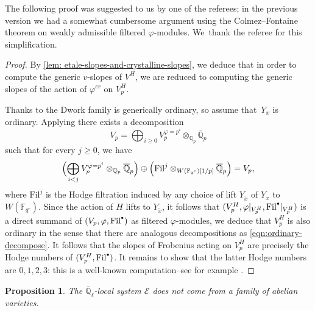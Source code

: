 \documentclass[11pt]{article}
\newcommand{\csbullet}{{\raisebox{1pt}{$\scriptscriptstyle\bullet$}}}
\numberwithin{equation}{subsection}
\newtheorem{prop}[thm]{Proposition}
\theoremstyle{definition}
\newcommand\Fil{\mathrm{Fil}}
\newcommand{\Qp}{\mathbb{Q}_p}
\newcommand{\Qpbar}{\overline{\mathbb Q}_p}
\newcommand{\Qlbar}{\overline{\mathbb{Q}}_{\ell}}
\begin{document}
The following proof was suggested to us by one of the referees; in the previous version we had a somewhat cumbersome argument using the Colmez--Fontaine theorem on weakly admissible filtered $\varphi$-modules. We~thank the referee for this simplification.

\begin{proof}
By \cref{lem: etale-slopes-and-crystalline-slopes}, we deduce that in order to compute the generic $v$-slopes of $V^H$, we are reduced to computing the generic slopes of the action of $\varphi^{er}$ on $V_p^H$.

Thanks to \cite[Th.\,2.2]{Yu-Variation-of-the-Unit-Root-Along-the-Dwork-Family-of-Calabi-Yau-Varieties} the Dwork family is generically ordinary, so assume that~$Y_x$ is ordinary. Applying \cite[Prop.\,1.3.2]{Deligne-Cristaux-ordinaires-et-coordonnees-canoniques} there exists a decomposition
\[
V_p=\bigoplus_{i\geq 0}V_p^{\varphi=p^i}\otimes_{\Qp}\Qpbar
\]
such that for every $j\geq 0$, we have
\begin{equation}\label{eqn:ordinary-decompose} \Bigl(\bigoplus_{i<j}V_p^{\varphi=p^i}\otimes_{\Qp}\Qpbar\Bigr)\oplus\Bigl(\mathrm{Fil}^j\otimes_{W(\mathbb{F}_{q^r})[1/p]}\Qpbar\Bigr)=V_p,
\end{equation}
where $\mathrm{Fil}^j$ is the Hodge filtration induced by any choice of lift $Y_{\tilde{x}}$ of $Y_x$ to $W(\mathbb{F}_{q^r})$. Since the action of $H$ lifts to $Y_{\tilde{x}}$, it follows that $(V_p^H, \varphi|_{V_{p}^H}, \Fil^{\csbullet}|_{V_{p}^H})$ is a direct summand of $(V_p, \varphi, \Fil^{\csbullet})$ as filtered $\varphi$-modules, we deduce that $V_p^H$ is also ordinary in the sense that there are analogous decompositions as \eqref{eqn:ordinary-decompose}. It follows that the slopes of Frobenius acting on $V_p^H$ are precisely the Hodge numbers of $(V_p^H, \Fil^{\csbullet})$. It remains to show that the latter Hodge numbers are $0,1,2,3$: this is a well-known computation--see for example \cite[Lem.\,1.5]{Harris-Shepherd-Barron-Taylor-A-Family-of-Calabi-Yau-Varieties-and-Potential-Automorphy}.
\end{proof}

\begin{prop}\label{prop: F-isoc-of-Dwork-family-does-not-come-from-ab-var}
The $\Qlbar$-local system $\mathcal{E}$ does not come from a family of abelian varieties.
\end{prop}
\end{document}
